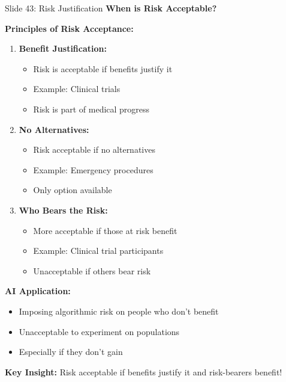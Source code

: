 \documentclass[8pt]{beamer}
\begin{document}
	\begin{frame}{Slide 43: Risk Justification}
		\fontsize{6.5}{7.5}\selectfont
		\textbf{When is Risk Acceptable?}
		
		\vspace{0.1cm}
		\textbf{Principles of Risk Acceptance:}
		\begin{enumerate}
			\item \textbf{Benefit Justification:}
			\begin{itemize}
				\item Risk is acceptable if benefits justify it
				\item Example: Clinical trials
				\item Risk is part of medical progress
			\end{itemize}
			\item \textbf{No Alternatives:}
			\begin{itemize}
				\item Risk acceptable if no alternatives
				\item Example: Emergency procedures
				\item Only option available
			\end{itemize}
			\item \textbf{Who Bears the Risk:}
			\begin{itemize}
				\item More acceptable if those at risk benefit
				\item Example: Clinical trial participants
				\item Unacceptable if others bear risk
			\end{itemize}
		\end{enumerate}
		
		\vspace{0.1cm}
		\textbf{AI Application:}
		\begin{itemize}
			\item Imposing algorithmic risk on people who don't benefit
			\item Unacceptable to experiment on populations
			\item Especially if they don't gain
		\end{itemize}
		
		\textcolor{myblue}{\textbf{Key Insight:}} Risk acceptable if \textcolor{myblue}{benefits justify it and risk-bearers benefit}!
	\end{frame}
	
\end{document}
